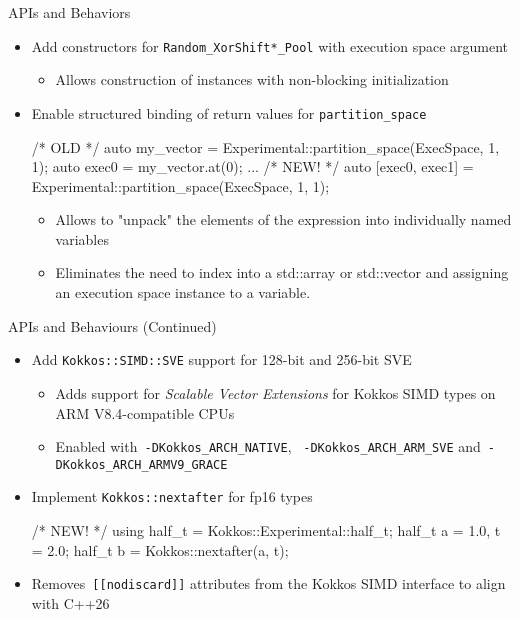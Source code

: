 \begin{frame}[fragile]{APIs and Behaviors}
 \begin{itemize}
  \item Add constructors for \texttt{Random\_XorShift*\_Pool} with execution space argument
      \begin{itemize}
      \item Allows construction of instances with non-blocking initialization
    \end{itemize}
   \item Enable structured binding of return values for \texttt{partition\_space}
        \begin{code}[keywords={std}]
          /* OLD */
          auto my_vector = 
                  Experimental::partition_space(ExecSpace, 1, 1);
          auto exec0 = my_vector.at(0);
          ...
          /* NEW! */
          auto [exec0, exec1] = 
                  Experimental::partition_space(ExecSpace, 1, 1);
        \end{code}
    \begin{itemize}
      \item Allows to "unpack" the elements of the expression into individually named variables
      \item Eliminates the need to index into a std::array or std::vector and assigning an execution space instance to a variable.
      \end{itemize}
 \end{itemize}
\end{frame}


\begin{frame}[fragile]{APIs and Behaviours (Continued)}
 \begin{itemize}
     \item Add \texttt{Kokkos::SIMD::SVE} support for 128-bit and 256-bit SVE 
     \begin{itemize}
      \item Adds support for \emph{Scalable Vector Extensions} for Kokkos SIMD types on ARM V8.4-compatible CPUs
      \item Enabled with~\texttt{-DKokkos\_ARCH\_NATIVE}, ~\texttt{-DKokkos\_ARCH\_ARM\_SVE} and~\texttt{-DKokkos\_ARCH\_ARMV9\_GRACE}
     \end{itemize}
     \item Implement \texttt{Kokkos::nextafter} for fp16 types
        \begin{code}[keywords={std}]
          /* NEW! */
          using half_t = Kokkos::Experimental::half_t;
          half_t a = 1.0, t = 2.0;
          half_t b = Kokkos::nextafter(a, t);
        \end{code}
        \item Removes~\texttt{[[nodiscard]]} attributes from the Kokkos SIMD interface to align with C++26
 \end{itemize}
\end{frame}

